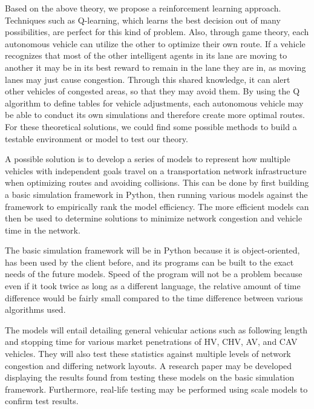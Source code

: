 \documentclass[10pt,letterpaper,draftclsnofoot,onecolumn]{IEEEtran}
\begin{document}
Based on the above theory, we propose a reinforcement learning approach. Techniques such as Q-learning, which learns the best decision out of many possibilities, are perfect for this kind of problem. Also, through game theory, each autonomous vehicle can utilize the other to optimize their own route. If a vehicle recognizes that most of the other intelligent agents in its lane are moving to another it may be in its best reward to remain in the lane they are in, as moving lanes may just cause congestion. Through this shared knowledge, it can alert other vehicles of congested areas, so that they may avoid them. By using the Q algorithm to define tables for vehicle adjustments, each autonomous vehicle may be able to conduct its own simulations and therefore create more optimal routes. For these theoretical solutions, we could find some possible methods to build a testable environment or model to test our theory.

A possible solution is to develop a series of models to represent how multiple vehicles with independent goals travel on a transportation network infrastructure when optimizing routes and avoiding collisions. This can be done by first building a basic simulation framework in Python, then running various models against the framework to empirically rank the model efficiency. The more efficient models can then be used to determine solutions to minimize network congestion and vehicle time in the network.

The basic simulation framework will be in Python because it is object-oriented, has been used by the client before, and its programs can be built to the exact needs of the future models. Speed of the program will not be a problem because even if it took twice as long as a different language, the relative amount of time difference would be fairly small compared to the time difference between various algorithms used.

The models will entail detailing general vehicular actions such as following length and stopping time for various market penetrations of HV, CHV, AV, and CAV vehicles. They will also test these statistics against multiple levels of network congestion and differing network layouts. A research paper may be developed displaying the results found from testing these models on the basic simulation framework. Furthermore, real-life testing may be performed using scale models to confirm test results.
\end{document}
